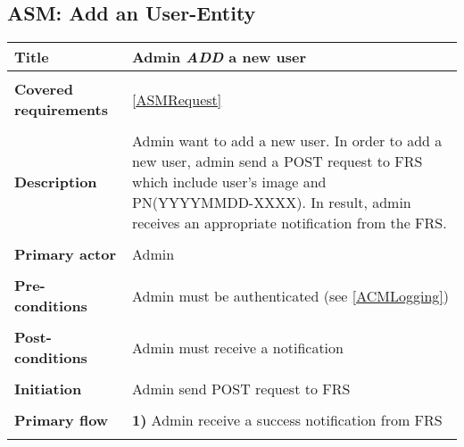 \documentclass[a4paper,11pt]{article}
\begin{document}
\subsection{ASM: Add an User-Entity}

\begin{tabular}{|p{3.5cm}|p{11.5cm}|} \hline
    \textbf{Title} &   Admin \emph{ADD} a new user
        
    \\ \hline \rowcolor{Gray} & \\ \hline
    
    \textbf{Covered requirements} &  \ref{ASMRequest}
    
    \\ \hline \rowcolor{Gray} & \\ \hline
    
    \textbf{Description} &  Admin want to add a new user. In order to add a new user, admin send a POST request to FRS which include user's image and PN(YYYYMMDD-XXXX). In result, admin receives an appropriate notification from the FRS.
        
    \\ \hline \rowcolor{Gray} & \\ \hline
        
    \textbf{Primary actor} & Admin  
        
    \\ \hline \rowcolor{Gray} & \\ \hline 
          
    \textbf{Pre-conditions} &   Admin must be authenticated (see \ref{ACMLogging})
        
    \\ \hline \rowcolor{Gray} & \\ \hline
         
    \textbf{Post-conditions} &   Admin must receive a notification
        
    \\ \hline \rowcolor{Gray} & \\ \hline 
         
    \textbf{Initiation} & Admin send POST request to FRS
        
    \\ \hline \rowcolor{Gray} & \\ \hline 
         
    \textbf{Primary flow} &
    \textbf{1)} Admin receive a success notification from FRS
        
    \\ \hline \rowcolor{Gray} & \\ \hline 
         

\end{tabular}
\end{document}
